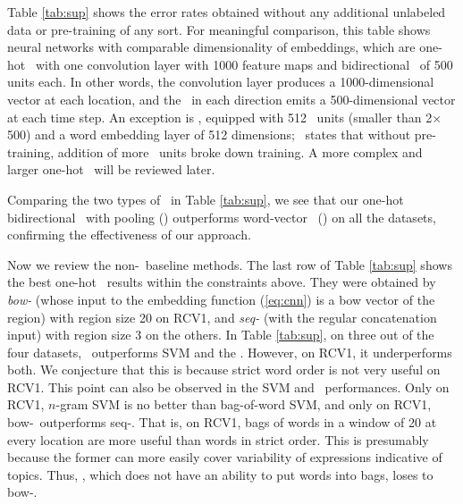\documentclass{article}
\begin{document}
Table \ref{tab:sup} shows the error rates obtained without any additional unlabeled data 
or pre-training of any sort. 
For meaningful comparison, this table 
shows neural networks with comparable dimensionality of embeddings, 
which are one-hot \cnn\ with one convolution layer with 1000 feature maps 
and bidirectional \lstms\ of 500 units each.  
In other words, the convolution layer produces a 1000-dimensional vector at each location, 
and the \lstm\ in each direction emits a 500-dimensional vector at each time step. 
An exception is 
\wvLstm, equipped with 512 \lstm\ units (smaller than 2$\times$500) 
and a word embedding layer of 512 dimensions; \DLa\ states that without pre-training, addition of more \lstm\ units broke down training.  
A more complex and larger one-hot \cnn\ will be reviewed later. 

Comparing the two types of \lstm\ in Table \ref{tab:sup}, we see that our one-hot bidirectional \lstm\ with pooling (\ohBiLstm) 
outperforms word-vector \lstm\ (\wvLstm) on all the datasets, confirming the effectiveness of our approach. 
\iffalse
The purpose of testing \wvBiLstm\ (word-vector bidirectional \lstm\ with pooling) 
was to measure the benefit of the elimination of word embedding.  
The only difference from \ohBiLstm\ is that \wvBiLstm\ has a word embedding layer of 
500 dimensions feeding to \lstms.  
Comparing it with \ohBiLstm, we see 
that elimination of a word embedding layer results in 
error reduction, and 
comparison with \wvLstm\ shows that pooling and addition of a backward \lstm\ also 
reduce errors.  
\fi

Now we review the non-\lstm\ baseline methods. 
The last row of Table \ref{tab:sup} shows the best one-hot \cnn\ results 
within the constraints above.  
They were obtained by {\em bow-\cnn} (whose input to the embedding function (\ref{eq:cnn}) is a bow vector of the region) with region size 20 
on RCV1, and {\em seq-\cnn} (with the regular concatenation input) 
with region size 3 on the others.   
In Table \ref{tab:sup}, 
on three out of the four datasets, \ohBiLstm\ outperforms SVM and the \cnn. 
However, on RCV1, it underperforms both.    
We conjecture that this is because strict word order is not very useful on RCV1. 
This point can also be observed in the SVM and \cnn\ performances. 
Only on RCV1, $n$-gram SVM is no better than bag-of-word SVM, and 
only on RCV1, bow-\cnn\ outperforms seq-\cnn.  
That is, on RCV1, 
bags of words in a window of 20 at every location are more useful than words in strict order. 
This is 
presumably because the former can more easily cover variability of expressions indicative of topics. 
Thus, \lstm, which does not have an ability to put words into bags, loses to bow-\cnn.  
\end{document}
